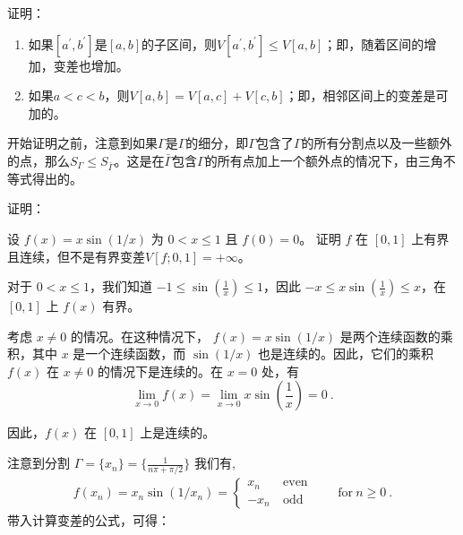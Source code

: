 \begin{example}{证明：}

\end{example}
\begin{theorem}{}
\begin{enumerate}
\item 如果$[a^{\prime},b^{\prime}]$是$[a,b]$的子区间，则$V[a^{\prime},b^{\prime}]\leq V[a,b]$；即，随着区间的增加，变差也增加。
\item 如果$a<c<b$，则$V[a,b]=V[a,c]+V[c,b]$；即，相邻区间上的变差是可加的。
\end{enumerate}
\end{theorem}
开始证明之前，注意到如果$\Gamma$是$\Gamma$的细分，即$\Gamma$包含了$\Gamma$的所有分割点以及一些额外的点，那么$S_{\Gamma}\leq S_{\bar{\Gamma}}$。这是在$\bar{\Gamma}$包含$\Gamma$的所有点加上一个额外点的情况下，由三角不等式得出的。

\begin{example}{证明：}

\end{example}

\begin{example}{设 $f(x)=x\sin\left(1/x\right)$ 为 $0<x\leq1$ 且 $f(0)=0$。 证明 $f$ 在 $[0,1]$ 上有界且连续，但不是有界变差$V[f;0,1]=+\infty$。}

对于 $0 < x \leq 1$，我们知道 $-1 \leq \sin\left(\frac{1}{x}\right) \leq 1$，因此 $-x \leq x\sin\left(\frac{1}{x}\right) \leq x$，在 $[0,1]$ 上 $f(x)$ 有界。

考虑 $x \neq 0$ 的情况。在这种情况下， $f(x) = x \sin(1/x)$ 是两个连续函数的乘积，其中 $x$ 是一个连续函数，而 $\sin(1/x)$ 也是连续的。因此，它们的乘积 $f(x)$ 在 $x \neq 0$ 的情况下是连续的。在 $x = 0$ 处，有
\begin{equation}
\lim_{{x \to 0}} f(x) = \lim_{{x \to 0}} x \sin\left(\frac{1}{x}\right) = 0~.
\end{equation}

因此，$f(x)$ 在 $[0,1]$ 上是连续的。

注意到分割 $\Gamma = \{x_n\}=\{\frac{1}{n\pi+\pi/2}\}$ 我们有,  
\begin{align} f(x_n)=x_n\sin(1/x_n)=\left\{\begin{matrix}x_n& \ \text{even}\\ -x_n& \ \text{odd}\end{matrix}\right.\qquad\text{for}\ n\geq0 ~.
\end{align}
带入计算变差的公式，可得：

\end{example}

